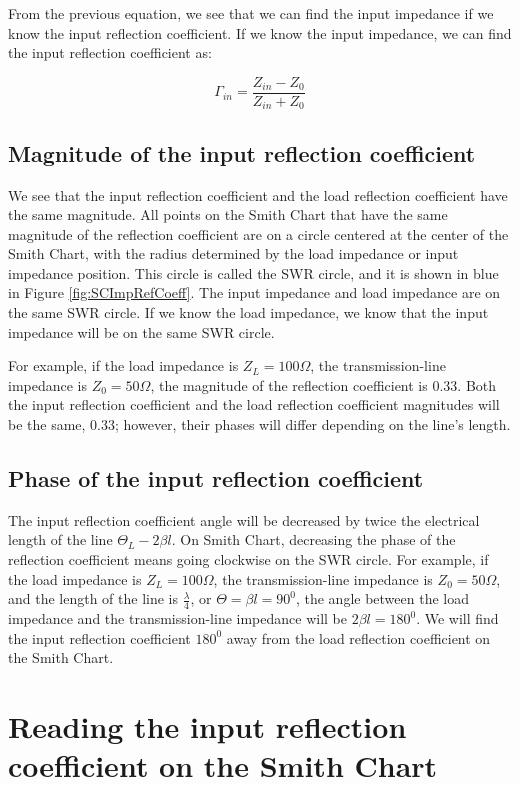 \documentclass{ximera}
\begin{document}
From the previous equation, we see that we can find the input impedance if we know the input reflection coefficient. If we know the input impedance, we can find the input reflection coefficient as:

\begin{equation}
\Gamma_{in} = \frac{Z_{in}-Z_0}{Z_{in}+Z_0}
\end{equation}

\subsection{Magnitude of the input reflection coefficient}
We see that the input reflection coefficient and the load reflection coefficient have the same magnitude. All points on the Smith Chart that have the same magnitude of the reflection coefficient are on a circle centered at the center of the Smith Chart, with the radius determined by the load impedance or input impedance position. This circle is called the SWR circle, and it is shown in blue in Figure \ref{fig:SCImpRefCoeff}. The input impedance and load impedance are on the same SWR circle. If we know the load impedance, we know that the input impedance will be on the same SWR circle.

For example, if the load impedance is $Z_L=100\Omega$, the transmission-line impedance is $Z_0=50\Omega$, the magnitude of the reflection coefficient is 0.33. Both the input reflection coefficient and the load reflection coefficient magnitudes will be the same, 0.33; however, their phases will differ depending on the line's length.

\subsection{Phase of the input reflection coefficient}
The input reflection coefficient angle will be decreased by twice the electrical length of the line $\Theta_{L} -2 \beta l$. On Smith Chart, decreasing the phase of the reflection coefficient means going clockwise on the SWR circle. For example, if the load impedance is $Z_L=100\Omega$, the transmission-line impedance is $Z_0=50\Omega$, and the length of the line is $\frac{\lambda}{4}$, or $\Theta=\beta l= 90^0$, the angle between the load impedance and the transmission-line impedance will be $2 \beta l = 180^0$. We will find the input reflection coefficient $180^0$ away from the load reflection coefficient on the Smith Chart.

 
\section{Reading the input reflection coefficient on the Smith Chart}
\end{document}
